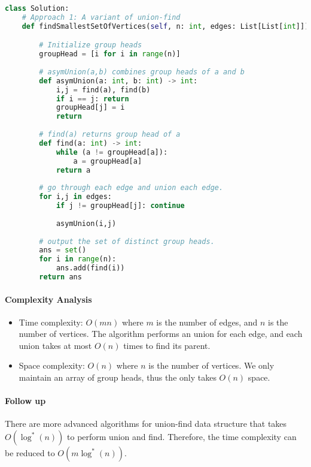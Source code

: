 \documentclass[12pt,letterpaper]{article}
\begin{document}
\begin{lstlisting}[language = Python]
class Solution:
    # Approach 1: A variant of union-find  
    def findSmallestSetOfVertices(self, n: int, edges: List[List[int]]) -> List[int]:

        # Initialize group heads
        groupHead = [i for i in range(n)]
        
        # asymUnion(a,b) combines group heads of a and b
        def asymUnion(a: int, b: int) -> int:
            i,j = find(a), find(b)
            if i == j: return
            groupHead[j] = i
            return
        
        # find(a) returns group head of a
        def find(a: int) -> int:
            while (a != groupHead[a]):
                a = groupHead[a]
            return a
        
        # go through each edge and union each edge.
        for i,j in edges:
            if j != groupHead[j]: continue
            
            asymUnion(i,j)
        
        # output the set of distinct group heads.
        ans = set()
        for i in range(n):
            ans.add(find(i))
        return ans
\end{lstlisting}

\paragraph{Complexity Analysis}
\begin{itemize}
\item Time complexity: $O(mn)$ where $m$ is the number of edges, and $n$ is the number of vertices.
The algorithm performs an union for each edge, and each union takes at most $O(n)$ times to find its parent.

\item Space complexity: $O(n)$ where $n$ is the number of vertices. We only maintain an array of group heads, thus the only takes $O(n)$ space.
\end{itemize}

\paragraph{Follow up} There are more advanced algorithms for union-find data structure that takes $O(\log^*(n))$ to perform union and find. Therefore, the time complexity can be reduced to $O(m\log^*(n))$.  
\end{document}
